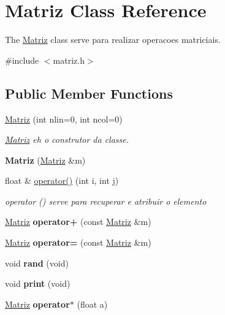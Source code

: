 \hypertarget{class_matriz}{}\section{Matriz Class Reference}
\label{class_matriz}


The \hyperlink{class_matriz}{Matriz} class serve para realizar operacoes matriciais.  




{\ttfamily \#include $<$matriz.\+h$>$}

\subsection*{Public Member Functions}
\begin{DoxyCompactItemize}
\item 
\hyperlink{class_matriz_a8f78d455cb7f0fc51b7f216cd08c67de}{Matriz} (int nlin=0, int ncol=0)
\begin{DoxyCompactList}\small\item\em \hyperlink{class_matriz}{Matriz} eh o construtor da classe. \end{DoxyCompactList}\item 
{\bfseries Matriz} (\hyperlink{class_matriz}{Matriz} \&m)\hypertarget{class_matriz_a8f3e37e196821d75d8043339fec10792}{}\label{class_matriz_a8f3e37e196821d75d8043339fec10792}

\item 
float \& \hyperlink{class_matriz_a7a84e7fb199e8f55681ac1b594be7ee4}{operator()} (int i, int j)
\begin{DoxyCompactList}\small\item\em operator () serve para recuperar e atribuir o elemento \end{DoxyCompactList}\item 
\hyperlink{class_matriz}{Matriz} {\bfseries operator+} (const \hyperlink{class_matriz}{Matriz} \&m)\hypertarget{class_matriz_a64b453c6c27e6189ef8661ab3d242b16}{}\label{class_matriz_a64b453c6c27e6189ef8661ab3d242b16}

\item 
\hyperlink{class_matriz}{Matriz} {\bfseries operator=} (const \hyperlink{class_matriz}{Matriz} \&m)\hypertarget{class_matriz_ae31f04bcc48d4d514c025368b392a7b8}{}\label{class_matriz_ae31f04bcc48d4d514c025368b392a7b8}

\item 
void {\bfseries rand} (void)\hypertarget{class_matriz_a25edbf11a63be864d4beb610c621e410}{}\label{class_matriz_a25edbf11a63be864d4beb610c621e410}

\item 
void {\bfseries print} (void)\hypertarget{class_matriz_a9928f485abd0f424546a0c80caf18372}{}\label{class_matriz_a9928f485abd0f424546a0c80caf18372}

\item 
\hyperlink{class_matriz}{Matriz} {\bfseries operator$\ast$} (float a)\hypertarget{class_matriz_a062fee2a1bbf0478dcc7d2d16a33f813}{}\label{class_matriz_a062fee2a1bbf0478dcc7d2d16a33f813}

\end{DoxyCompactItemize}
